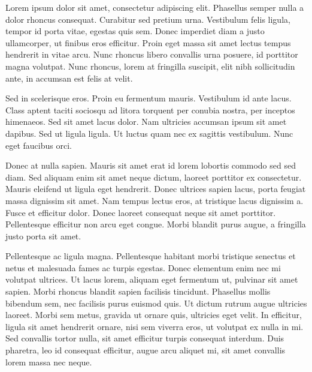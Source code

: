 Lorem ipsum dolor sit amet, consectetur adipiscing elit. Phasellus semper nulla a dolor rhoncus consequat. Curabitur sed pretium urna. Vestibulum felis ligula, tempor id porta vitae, egestas quis sem. Donec imperdiet diam a justo ullamcorper, ut finibus eros efficitur. Proin eget massa sit amet lectus tempus hendrerit in vitae arcu. Nunc rhoncus libero convallis urna posuere, id porttitor magna volutpat. Nunc rhoncus, lorem at fringilla suscipit, elit nibh sollicitudin ante, in accumsan est felis at velit.

Sed in scelerisque eros. Proin eu fermentum mauris. Vestibulum id ante lacus. Class aptent taciti sociosqu ad litora torquent per conubia nostra, per inceptos himenaeos. Sed sit amet lacus dolor. Nam ultricies accumsan ipsum sit amet dapibus. Sed ut ligula ligula. Ut luctus quam nec ex sagittis vestibulum. Nunc eget faucibus orci.

Donec at nulla sapien. Mauris sit amet erat id lorem lobortis commodo sed sed diam. Sed aliquam enim sit amet neque dictum, laoreet porttitor ex consectetur. Mauris eleifend ut ligula eget hendrerit. Donec ultrices sapien lacus, porta feugiat massa dignissim sit amet. Nam tempus lectus eros, at tristique lacus dignissim a. Fusce et efficitur dolor. Donec laoreet consequat neque sit amet porttitor. Pellentesque efficitur non arcu eget congue. Morbi blandit purus augue, a fringilla justo porta sit amet.

Pellentesque ac ligula magna. Pellentesque habitant morbi tristique senectus et netus et malesuada fames ac turpis egestas. Donec elementum enim nec mi volutpat ultrices. Ut lacus lorem, aliquam eget fermentum ut, pulvinar sit amet sapien. Morbi rhoncus blandit sapien facilisis tincidunt. Phasellus mollis bibendum sem, nec facilisis purus euismod quis. Ut dictum rutrum augue ultricies laoreet. Morbi sem metus, gravida ut ornare quis, ultricies eget velit. In efficitur, ligula sit amet hendrerit ornare, nisi sem viverra eros, ut volutpat ex nulla in mi. Sed convallis tortor nulla, sit amet efficitur turpis consequat interdum. Duis pharetra, leo id consequat efficitur, augue arcu aliquet mi, sit amet convallis lorem massa nec neque.
